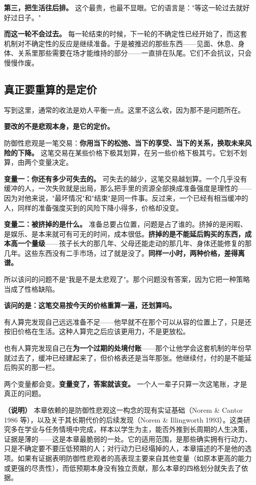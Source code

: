 \documentclass[11pt,a4paper]{ctexart}
\begin{document}
\textbf{第三，把生活往后排。} 这个最贵，也最不显眼。它的语言是："等这一轮过去就好好过日子。"

\textbf{而这一轮不会过去。} 每一轮结束的时候，下一轮的不确定性已经开始了，而这套机制对不确定性的反应是继续准备。于是被推迟的那些东西——见面、休息、身体、关系里那些需要在场才能维持的部分——一直排在队尾。它们不会抗议，只会慢慢作废。

\subsection{真正要重算的是定价}

写到这里，通常的收法是劝人平衡一点。这里不这么收，因为那不是问题所在。

\textbf{要改的不是悲观本身，是它的定价。}

防御性悲观是一笔交易：\textbf{你用当下的松弛、当下的享受、当下的关系，换取未来风险的下降。} 这笔交易在某些价格下极其划算，在另一些价格下极其亏。它划不划算，由两个变量决定。

\textbf{变量一：你还有多少可失去的。} 可失去的越少，这笔交易越划算。一个几乎没有缓冲的人，一次失败就是出局，那么把手里的资源全部换成准备强度是理性的——因为对他来说，"最坏情况"和"结束"是同一件事。反过来，一个已经有相当缓冲的人，同样的准备强度买到的风险下降小得多，价格却没变。

\textbf{变量二：被挤掉的是什么。} 准备总要占位置，问题是占了谁的。挤掉的是闲暇、是娱乐、是本来就可有可无的时间，成本很低。\textbf{挤掉的是不能延后购买的东西，成本高一个量级}——孩子长大的那几年、父母还能走动的那几年、身体还能修复的那几年。这些东西没有二手市场，过了就是没了。\textbf{同样一小时，两种价格，差得离谱。}

所以该问的问题不是"我是不是太悲观了"。那个问题没有答案，因为它把一种策略当成了性格缺陷。

\textbf{该问的是：这笔交易按今天的价格重算一遍，还划算吗。}

有人算完发现自己远远准备不足——他早就不在那个可以从容的位置上了，只是还按旧价格在生活。这种人算完之后应该更用力，不是更放松。

也有人算完发现自己在\textbf{为一个过期的处境付账}——那个让他学会这套机制的年份早就过去了，缓冲已经建起来了，但价格表还是当年那张。他继续付，付的是不能延后购买的那一栏。

两个变量都会变。\textbf{变量变了，答案就该变。} 一个人一辈子只算一次这笔账，才是真正的问题。

\textbf{（说明）} 本章依赖的是防御性悲观这一构念的现有实证基础（Norem \& Cantor 1986 等），以及关于其长期代价的后续发现（Norem \& Illingworth 1993）。这类研究多在学业与任务情境中完成，样本以学生为主，能否外推到长周期的人生决策，证据是薄的——这是本章最脆弱的一处。它的适用范围，是那些确实拥有行动力、只是不确定要不要压低预期的人；对行动力已经塌掉的人，本章描述的不是他的选项。如果有证据表明防御性悲观者的高表现主要来自其他变量（如原本更高的能力或更强的尽责性），而低预期本身没有独立贡献，那么本章的四格划分就失去了依据。
\end{document}
